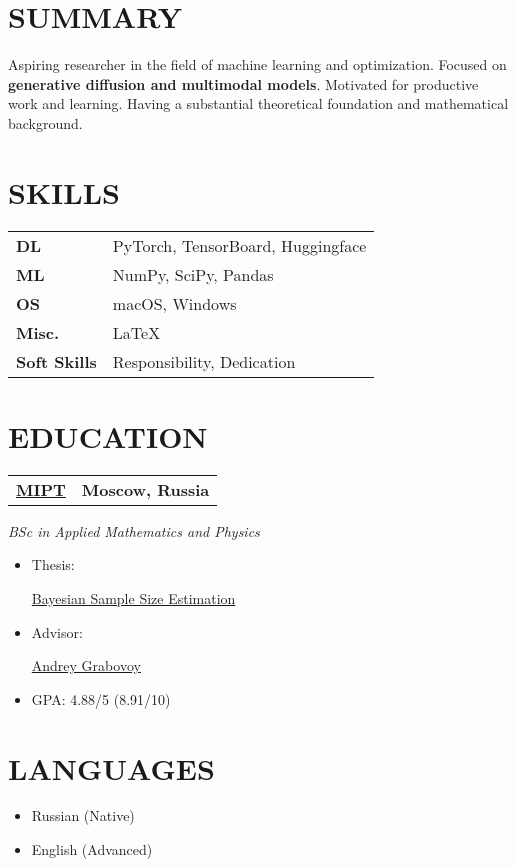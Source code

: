 \documentclass[11pt,a4paper]{moderncv}
\newcommand*{\educationentry}[4][0.5mm]{
    \begin{tabularx}{\textwidth}{LR}
        {\bfseries #3} & {\bfseries #4} \\
    \end{tabularx}
    {\itshape #2}
    \par\addvspace{#1}
}
\newcommand*{\scoreentry}[3][2.5mm]{
    {\bfseries #2} \\
    {\itshape #3}
    \par\addvspace{#1}
}
\begin{document}
\begin{minipage}[t]{0.35\textwidth}

\section{SUMMARY}
Aspiring researcher in the field of machine learning and optimization.  Focused on \textbf{generative diffusion and multimodal models}. Motivated for productive work and learning. Having a substantial theoretical foundation and mathematical background.

\section{SKILLS}
\begin{tabularx}{\textwidth}{>{\bfseries}l@{\hskip 3.5mm}L}
DL & PyTorch, TensorBoard, Huggingface \\
ML & NumPy, SciPy, Pandas \\
OS & macOS, Windows \\
Misc. & \LaTeX \\
Soft Skills & Responsibility, Dedication
\end{tabularx}

\section{EDUCATION}
\educationentry{BSc in Applied Mathematics and Physics}{\href{https://mipt.ru}{MIPT}}{Moscow, Russia}
\begin{itemize}
\item Thesis: \par \href{https://github.com/intsystems/Kiselev-BS-Thesis}{Bayesian Sample Size Estimation}
\item Advisor: \par \href{https://andriygav.github.io}{Andrey Grabovoy}
\item GPA: 4.88/5 (8.91/10)
\end{itemize}


\section{LANGUAGES}
\begin{itemize}
    \item Russian (Native)
    \item English (Advanced)
\end{itemize}


\end{minipage}
\end{document}
